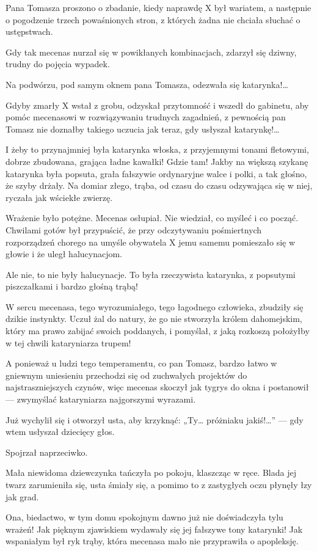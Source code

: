 Pana Tomasza proszono o zbadanie, kiedy naprawdę X był wariatem, a
następnie o pogodzenie trzech powaśnionych stron, z których żadna nie
chciała słuchać o ustępstwach.

Gdy tak mecenas nurzał się w powikłanych kombinacjach, zdarzył się
dziwny, trudny do pojęcia wypadek.

Na podwórzu, pod samym oknem pana Tomasza, odezwała się katarynka!…

Gdyby zmarły X wstał z grobu, odzyskał przytomność i wszedł do
gabinetu, aby pomóc mecenasowi w rozwiązywaniu trudnych zagadnień, z
pewnością pan Tomasz nie doznałby takiego uczucia jak teraz, gdy
usłyszał katarynkę!…

I żeby to przynajmniej była katarynka włoska, z przyjemnymi tonami
fletowymi, dobrze zbudowana, grająca ładne kawałki! Gdzie tam! Jakby
na większą szykanę katarynka była popsuta, grała fałszywie ordynaryjne
walce i polki, a tak głośno, że szyby drżały. Na domiar złego, trąba,
od czasu do czasu odzywająca się w niej, ryczała jak wściekłe zwierzę.

Wrażenie było potężne. Mecenas osłupiał. Nie wiedział, co myśleć i co
począć. Chwilami gotów był przypuścić, że przy odczytywaniu
pośmiertnych rozporządzeń chorego na umyśle obywatela X jemu samemu
pomieszało się w głowie i że uległ halucynacjom.

Ale nie, to nie były halucynacje. To była rzeczywista katarynka, z
popsutymi piszczałkami i bardzo głośną trąbą!

W sercu mecenasa, tego wyrozumiałego, tego łagodnego człowieka,
zbudziły się dzikie instynkty. Uczuł żal do natury, że go nie
stworzyła królem dahomejskim, który ma prawo zabijać swoich poddanych,
i pomyślał, z jaką rozkoszą położyłby w tej chwili kataryniarza
trupem!

A ponieważ u ludzi tego temperamentu, co pan Tomasz, bardzo łatwo w
gniewnym uniesieniu przechodzi się od zuchwałych projektów do
najstraszniejszych czynów, więc mecenas skoczył jak tygrys do okna i
postanowił — zwymyślać kataryniarza najgorszymi wyrazami.

Już wychylił się i otworzył usta, aby krzyknąć: „Ty… próżniaku
jakiś!…” — gdy wtem usłyszał dziecięcy głos.

Spojrzał naprzeciwko.

Mała niewidoma dziewczynka tańczyła po pokoju, klaszcząc w ręce. Blada
jej twarz zarumieniła się, usta śmiały się, a pomimo to z zastygłych
oczu płynęły łzy jak grad.

Ona, biedactwo, w tym domu spokojnym dawno już nie doświadczyła tylu
wrażeń! Jak pięknym zjawiskiem wydawały się jej fałszywe tony
katarynki! Jak wspaniałym był ryk trąby, która mecenasa mało nie
przyprawiła o apopleksję.

